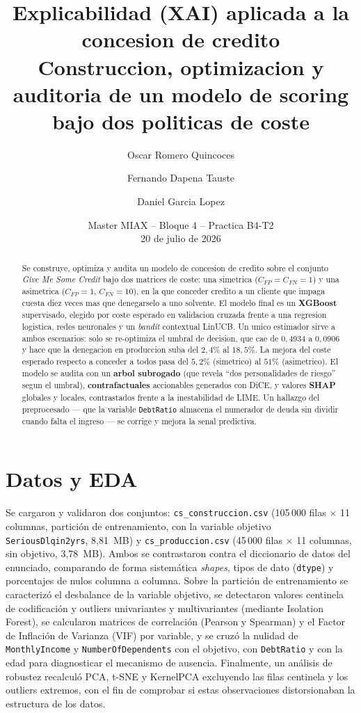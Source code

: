 \documentclass[11pt,a4paper]{article}
\title{\textbf{Explicabilidad (XAI) aplicada a la concesion de credito}\\[2pt]
\large Construccion, optimizacion y auditoria de un modelo de scoring bajo dos politicas de coste}
\author{Oscar Romero Quincoces \and Fernando Dapena Tauste \and Daniel Garcia Lopez}
\date{Master MIAX -- Bloque 4 -- Practica B4-T2 \\ 20 de julio de 2026}
\begin{document}
\maketitle

\begin{abstract}
Se construye, optimiza y audita un modelo de concesion de credito sobre el conjunto
\emph{Give Me Some Credit} bajo dos matrices de coste: una simetrica ($C_{FP}=C_{FN}=1$) y una
asimetrica ($C_{FP}=1$, $C_{FN}=10$), en la que conceder credito a un cliente que impaga cuesta diez
veces mas que denegarselo a uno solvente. El modelo final es un \textbf{XGBoost} supervisado, elegido
por coste esperado en validacion cruzada frente a una regresion logistica, redes neuronales y un
\emph{bandit} contextual LinUCB. Un unico estimador sirve a ambos escenarios: solo se re-optimiza el
umbral de decision, que cae de $0{,}4934$ a $0{,}0906$ y hace que la denegacion en produccion suba del
$2{,}4\%$ al $18{,}5\%$. La mejora del coste esperado respecto a conceder a todos pasa del $5{,}2\%$
(simetrico) al $51\%$ (asimetrico). El modelo se audita con un \textbf{arbol subrogado} (que revela
``dos personalidades de riesgo'' segun el umbral), \textbf{contrafactuales} accionables generados con
DiCE, y valores \textbf{SHAP} globales y locales, contrastados frente a la inestabilidad de LIME. Un
hallazgo del preprocesado --- que la variable \texttt{DebtRatio} almacena el numerador de deuda sin
dividir cuando falta el ingreso --- se corrige y mejora la senal predictiva.
\end{abstract}

\newpage
\section{Datos y EDA}

Se cargaron y validaron dos conjuntos: \texttt{cs\_construccion.csv} (105\,000 filas $\times$ 11 columnas, partici\'on de entrenamiento, con la variable objetivo \texttt{SeriousDlqin2yrs}, 8,81~MB) y \texttt{cs\_produccion.csv} (45\,000 filas $\times$ 11 columnas, sin objetivo, 3,78~MB). Ambos se contrastaron contra el diccionario de datos del enunciado, comparando de forma sistem\'atica \emph{shapes}, tipos de dato (\texttt{dtype}) y porcentajes de nulos columna a columna. Sobre la partici\'on de entrenamiento se caracteriz\'o el desbalance de la variable objetivo, se detectaron valores centinela de codificaci\'on y outliers univariantes y multivariantes (mediante Isolation Forest), se calcularon matrices de correlaci\'on (Pearson y Spearman) y el Factor de Inflaci\'on de Varianza (VIF) por variable, y se cruz\'o la nulidad de \texttt{MonthlyIncome} y \texttt{NumberOfDependents} con el objetivo, con \texttt{DebtRatio} y con la edad para diagnosticar el mecanismo de ausencia. Finalmente, un an\'alisis de robustez recalcul\'o PCA, t-SNE y KernelPCA excluyendo las filas centinela y los outliers extremos, con el fin de comprobar si estas observaciones distorsionaban la estructura de los datos.
\end{document}
